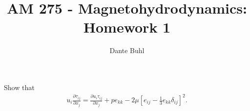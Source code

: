 \documentclass{article}
\begin{document}
\title{AM 275 - Magnetohydrodynamics: Homework 1}
\author{Dante Buhl}


\newcommand{\wrms}{w_{\text{rms}}}
\newcommand{\bs}[1]{\boldsymbol{#1}}
\newcommand{\tb}[1]{\textbf{#1}}
\newcommand{\bmp}[1]{\begin{minipage}{#1\textwidth}}
\newcommand{\emp}{\end{minipage}}
\newcommand{\R}{\mathbb{R}}
\newcommand{\C}{\mathbb{C}}
\newcommand{\N}{\mathcal{N}}
\newcommand{\K}{\bs{\mathrm{K}}}
\newcommand{\m}{\bs{\mu}_*}
\newcommand{\s}{\bs{\Sigma}_*}
\newcommand{\dt}{\Delta t}
\newcommand{\dx}{\Delta x}
\newcommand{\tr}[1]{\text{Tr}(#1)}
\newcommand{\Tr}[1]{\text{Tr}(#1)}
\newcommand{\Div}{\nabla \cdot}
\renewcommand{\div}{\nabla \cdot}
\newcommand{\Curl}{\nabla \times}
\newcommand{\Grad}{\nabla}
\newcommand{\grad}{\nabla}
\newcommand{\grads}{\nabla_s}
\newcommand{\gradf}{\nabla_f}
\newcommand{\xs}{x_s}
\newcommand{\xf}{x_f}
\newcommand{\ts}{t_s}
\newcommand{\tf}{t_f}
\newcommand{\pt}{\partial t}
\newcommand{\pz}{\partial z}
\newcommand{\uvec}{\bs{u}}
\newcommand{\F}{\bs{F}}
\newcommand{\T}{\tilde{T}}
\newcommand{\ez}{\bs{e}_z}
\newcommand{\ex}{\bs{e}_x}
\newcommand{\ey}{\bs{e}_y}
\newcommand{\eo}{\bs{e}_{\bs{\Omega}}}
\newcommand{\ppt}[1]{\frac{\partial #1}{\partial t}}
\newcommand{\DDt}[1]{\frac{D #1}{D t}}
\newcommand{\ppts}[1]{\frac{\partial #1}{\partial t_s}}
\newcommand{\pptf}[1]{\frac{\partial #1}{\partial t_f}}
\newcommand{\ppz}[1]{\frac{\partial #1}{\partial z}}
\newcommand{\ddz}[1]{\frac{d #1}{d z}}
\newcommand{\ppzetas}[1]{\frac{\partial^2 #1}{\partial \zeta^2}}
\newcommand{\ppzs}[1]{\frac{\partial #1}{\partial z_s}}
\newcommand{\ppzf}[1]{\frac{\partial #1}{\partial z_f}}
\newcommand{\ppx}[1]{\frac{\partial #1}{\partial x}}
\newcommand{\ppxi}[1]{\frac{\partial #1}{\partial x_i}}
\newcommand{\ppxj}[1]{\frac{\partial #1}{\partial x_j}}
\newcommand{\ppy}[1]{\frac{\partial #1}{\partial y}}
\newcommand{\ppzeta}[1]{\frac{\partial #1}{\partial \zeta}}


\maketitle 
\setlength{\parindent}{0pt}

\section{}

Show that 
\begin{gather*}
    u_i\ppxj{\tau_{ij}} = \ppxj{u_i\tau_{ij}} + pe_{kk} -
    2\mu\left[e_{ij} - \frac{1}{3}e_{kk}\delta_{ij}\right]^2. 
\end{gather*}
\end{document}
